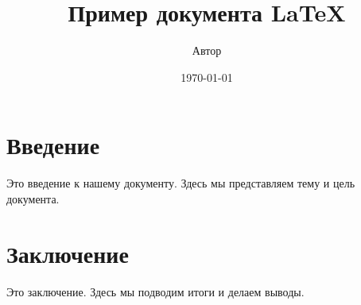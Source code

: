 \documentclass{article}
\title{Пример документа LaTeX}
\author{Автор}
\date{\today}
\begin{document}
\maketitle

\section{Введение}
Это введение к нашему документу. Здесь мы представляем тему и цель документа.

\section{Заключение}
Это заключение. Здесь мы подводим итоги и делаем выводы.
\end{document}
